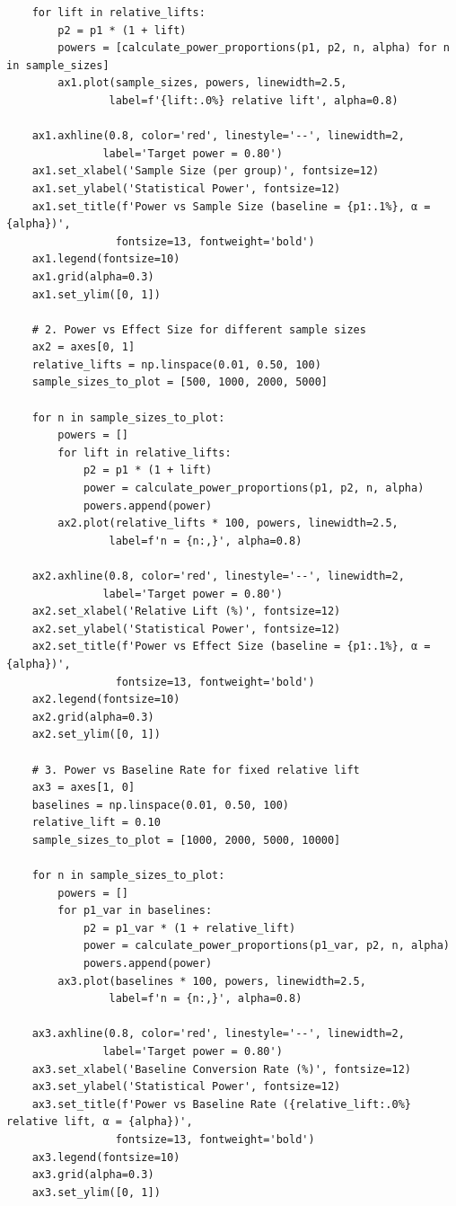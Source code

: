 \begin{lstlisting}
    for lift in relative_lifts:
        p2 = p1 * (1 + lift)
        powers = [calculate_power_proportions(p1, p2, n, alpha) for n in sample_sizes]
        ax1.plot(sample_sizes, powers, linewidth=2.5,
                label=f'{lift:.0%} relative lift', alpha=0.8)

    ax1.axhline(0.8, color='red', linestyle='--', linewidth=2,
               label='Target power = 0.80')
    ax1.set_xlabel('Sample Size (per group)', fontsize=12)
    ax1.set_ylabel('Statistical Power', fontsize=12)
    ax1.set_title(f'Power vs Sample Size (baseline = {p1:.1%}, α = {alpha})',
                 fontsize=13, fontweight='bold')
    ax1.legend(fontsize=10)
    ax1.grid(alpha=0.3)
    ax1.set_ylim([0, 1])

    # 2. Power vs Effect Size for different sample sizes
    ax2 = axes[0, 1]
    relative_lifts = np.linspace(0.01, 0.50, 100)
    sample_sizes_to_plot = [500, 1000, 2000, 5000]

    for n in sample_sizes_to_plot:
        powers = []
        for lift in relative_lifts:
            p2 = p1 * (1 + lift)
            power = calculate_power_proportions(p1, p2, n, alpha)
            powers.append(power)
        ax2.plot(relative_lifts * 100, powers, linewidth=2.5,
                label=f'n = {n:,}', alpha=0.8)

    ax2.axhline(0.8, color='red', linestyle='--', linewidth=2,
               label='Target power = 0.80')
    ax2.set_xlabel('Relative Lift (%)', fontsize=12)
    ax2.set_ylabel('Statistical Power', fontsize=12)
    ax2.set_title(f'Power vs Effect Size (baseline = {p1:.1%}, α = {alpha})',
                 fontsize=13, fontweight='bold')
    ax2.legend(fontsize=10)
    ax2.grid(alpha=0.3)
    ax2.set_ylim([0, 1])

    # 3. Power vs Baseline Rate for fixed relative lift
    ax3 = axes[1, 0]
    baselines = np.linspace(0.01, 0.50, 100)
    relative_lift = 0.10
    sample_sizes_to_plot = [1000, 2000, 5000, 10000]

    for n in sample_sizes_to_plot:
        powers = []
        for p1_var in baselines:
            p2 = p1_var * (1 + relative_lift)
            power = calculate_power_proportions(p1_var, p2, n, alpha)
            powers.append(power)
        ax3.plot(baselines * 100, powers, linewidth=2.5,
                label=f'n = {n:,}', alpha=0.8)

    ax3.axhline(0.8, color='red', linestyle='--', linewidth=2,
               label='Target power = 0.80')
    ax3.set_xlabel('Baseline Conversion Rate (%)', fontsize=12)
    ax3.set_ylabel('Statistical Power', fontsize=12)
    ax3.set_title(f'Power vs Baseline Rate ({relative_lift:.0%} relative lift, α = {alpha})',
                 fontsize=13, fontweight='bold')
    ax3.legend(fontsize=10)
    ax3.grid(alpha=0.3)
    ax3.set_ylim([0, 1])


\end{lstlisting}
